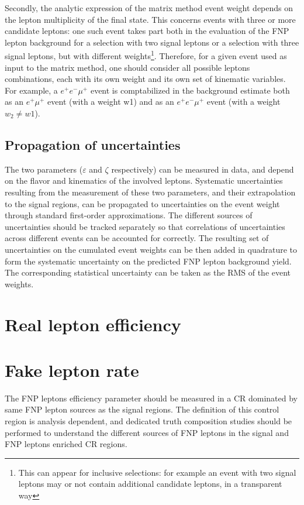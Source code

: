Secondly, the analytic expression of the matrix method event weight depends on the lepton multiplicity of the final state. This concerns events with three or more candidate leptons: one such event takes part both in the evaluation of the FNP lepton background for a selection with two signal leptons or a selection with three signal leptons, but with different weights\footnote{This can appear for inclusive selections: for example an event with two signal leptons may or not contain additional candidate leptons, in a transparent way}. Therefore, for a given event used as input to the matrix method, one should consider all possible leptons combinations, each with its own weight and its own set of kinematic variables. For example, a $e^+e^-\mu^+$ event is comptabilized in the background estimate both as an $e^+\mu^+$ event (with a weight w1) and as an $e^+e^-\mu^+$ event (with a weight $w_2\neq w1$).  

\subsection{Propagation of uncertainties}

The two parameters ($\varepsilon$ and $\zeta$ respectively) can be measured in data, and depend on the flavor and kinematics of the involved leptons.  Systematic uncertainties resulting from the measurement of these two parameters, and their extrapolation to the signal regions, can be propagated to uncertainties on the event weight through standard first-order approximations. The different sources of uncertainties should be tracked separately so that correlations of uncertainties across different events can be accounted for correctly. The resulting set of uncertainties on the cumulated event weights can be then added in quadrature to form the systematic uncertainty on the predicted FNP lepton background yield. The corresponding statistical uncertainty can be taken as the RMS of the event weights.


\section{Real lepton efficiency}


\section{Fake lepton rate}

The FNP leptons efficiency parameter should be measured in a CR dominated by same FNP lepton sources as the signal regions. The definition of this control region is analysis dependent, and dedicated truth composition studies should be performed to understand the different sources of FNP leptons in the signal and FNP leptons enriched CR regions. 

